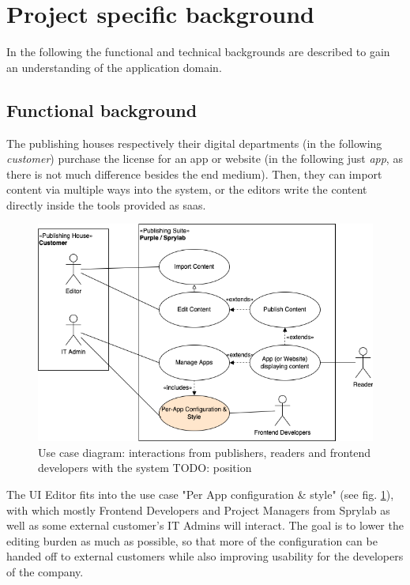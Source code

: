 \section{Project specific background}

In the following the functional and technical backgrounds are described to gain an understanding of the application domain.

\subsection{Functional background}

The publishing houses respectively their digital departments (in the following \textit{customer}) purchase the license for an app or website (in the following just \textit{app}, as there is not much difference besides the end medium).
Then, they can import content via multiple ways into the system, or the editors write the content directly inside the tools provided as \Gls{saas}.

\begin{figure}[h!]
  \includegraphics[width=\textwidth]{pics/purple-abstract.drawio.png}
  \caption{Use case diagram: interactions from publishers, readers and frontend developers with the system TODO: position}
  \label{fig:usecase1}
\end{figure}

The UI Editor fits into the use case "Per App configuration \& style" (see fig. \ref*{fig:usecase1}), with which mostly Frontend Developers and Project Managers from Sprylab as well as some external customer's IT Admins will interact. The goal is to lower the editing burden as much as possible, so that more of the configuration can be handed off to external customers while also improving usability for the developers of the company.

